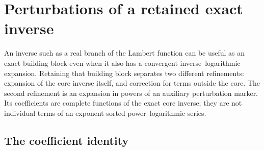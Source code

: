 \section{Perturbations of a retained exact inverse}
\label{sec:core-perturbations}

An inverse such as a real branch of the Lambert function can be useful as an exact building block even when it also has a convergent inverse--logarithmic expansion. Retaining that building block separates two different refinements: expansion of the core inverse itself, and correction for terms outside the core. The second refinement is an expansion in powers of an auxiliary perturbation marker. Its coefficients are complete functions of the exact core inverse; they are not individual terms of an exponent-sorted power--logarithmic series.

\subsection{The coefficient identity}

